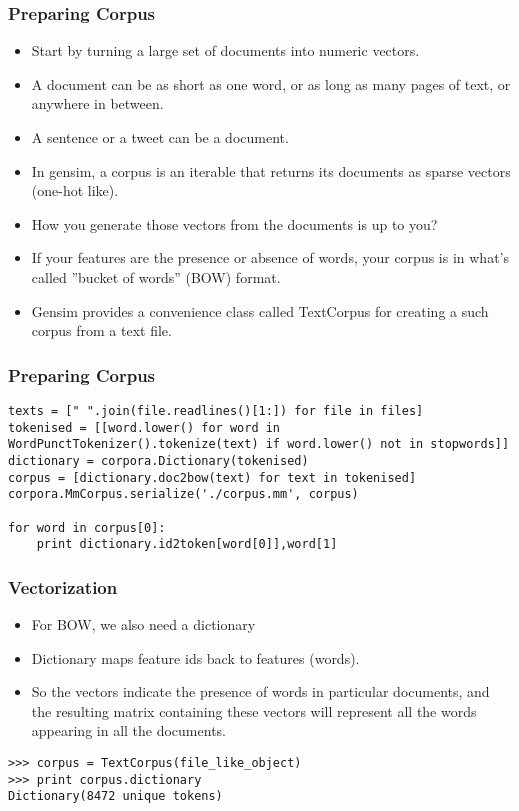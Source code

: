 \begin{frame}[fragile]\frametitle{Preparing Corpus}
  \begin{itemize}
  	\item Start by turning a large set of documents into numeric vectors. 
	\item A document can be as short as one word, or as long as many pages of text, or anywhere in between.
	\item A sentence or a tweet can be a document.
	\item In gensim, a corpus is an iterable that returns its documents as sparse vectors (one-hot like).
	\item How you generate those vectors from the documents is up to you?
	\item If your features are the presence or absence of words, your corpus is in what's called ''bucket of words'' (BOW) format. 			
	\item Gensim provides a convenience class called TextCorpus for creating a such corpus from a text file.

  \end{itemize}
\end{frame}

\begin{frame}[fragile]\frametitle{Preparing Corpus}
	\begin{lstlisting}
texts = [" ".join(file.readlines()[1:]) for file in files]
tokenised = [[word.lower() for word in WordPunctTokenizer().tokenize(text) if word.lower() not in stopwords]]
dictionary = corpora.Dictionary(tokenised)
corpus = [dictionary.doc2bow(text) for text in tokenised]
corpora.MmCorpus.serialize('./corpus.mm', corpus)

for word in corpus[0]:
	print dictionary.id2token[word[0]],word[1]
\end{lstlisting}
\end{frame}



\begin{frame}[fragile]\frametitle{Vectorization}
  \begin{itemize}
  	\item For BOW, we also need a dictionary
	\item Dictionary maps feature ids back to features (words). 
	\item So the vectors indicate the presence of words in particular documents, and the resulting matrix containing these vectors will represent all the words appearing in all the documents. 
  \end{itemize}
\begin{lstlisting}
>>> corpus = TextCorpus(file_like_object)
>>> print corpus.dictionary
Dictionary(8472 unique tokens)
\end{lstlisting}
\end{frame}



